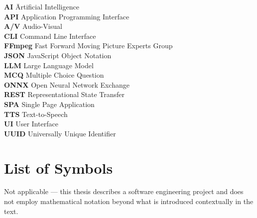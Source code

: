 \documentclass[12pt,a4paper,twoside,openright]{report}
\begin{document}
\begin{tabbing}
\textbf{AI} \hspace{2cm} \= Artificial Intelligence \\
\textbf{API} \> Application Programming Interface \\
\textbf{A/V} \> Audio-Visual \\
\textbf{CLI} \> Command Line Interface \\
\textbf{FFmpeg}\> Fast Forward Moving Picture Experts Group \\
\textbf{JSON} \> JavaScript Object Notation \\
\textbf{LLM} \> Large Language Model \\
\textbf{MCQ} \> Multiple Choice Question \\
\textbf{ONNX} \> Open Neural Network Exchange \\
\textbf{REST} \> Representational State Transfer \\
\textbf{SPA} \> Single Page Application \\
\textbf{TTS} \> Text-to-Speech \\
\textbf{UI} \> User Interface \\
\textbf{UUID} \> Universally Unique Identifier \\
\end{tabbing}

\cleardoublepage


\chapter*{List of Symbols}

Not applicable --- this thesis describes a software engineering project and does not employ mathematical notation beyond what is introduced contextually in the text.

\cleardoublepage



\tableofcontents

\cleardoublepage


\end{document}
